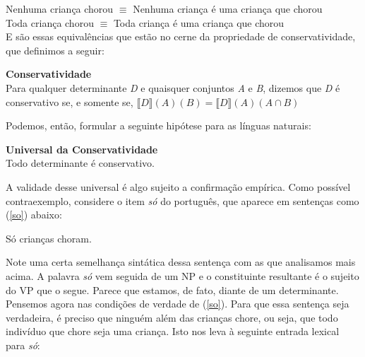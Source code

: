 \n Nenhuma criança chorou $\equiv$ Nenhuma criança é uma criança que chorou\\

\n Toda criança chorou $\equiv$ Toda criança é uma criança que chorou\\ 

\n E são essas equivalências que estão no cerne da propriedade de
conservatividade, que definimos a seguir:\\

\begin{tcolorbox}[boxrule=0pt,sharp corners]

\n\textbf{Conservatividade}\\
Para qualquer determinante \textit{D} e quaisquer conjuntos
\textit{A} e \textit{B}, dizemos que \textit{D} é conservativo se,
e somente se, $\llbracket D \rrbracket(A)(B)= \llbracket D \rrbracket(A)(A\cap B)$

\end{tcolorbox}

\bigskip

\n Podemos, então, formular a seguinte hipótese para as línguas naturais:\\

\begin{tcolorbox}[boxrule=0pt,sharp corners]

\n\textbf{Universal da Conservatividade}\\
Todo determinante é conservativo.

\end{tcolorbox}

\bigskip


\n A validade desse universal é algo sujeito a confirmação
empírica. Como possível contraexemplo, considere o item
\textit{só} do português, que aparece em sentenças como (\ref{so})
abaixo:

\begin{exe}
    \ex Só crianças choram. \label{so}
\end{exe}

\n Note uma certa semelhança sintática dessa sentença com as que
analisamos mais acima. A palavra \textit{só} vem seguida de um NP
e o constituinte resultante é o sujeito do VP que o segue. Parece
que estamos, de fato, diante de um determinante. Pensemos agora
nas condições de verdade de (\ref{so}). Para que essa sentença
seja verdadeira, é preciso que ninguém além das crianças chore, ou seja, que todo indivíduo que chore seja uma
criança. Isto nos leva à seguinte entrada lexical para
\textit{só}:\\


